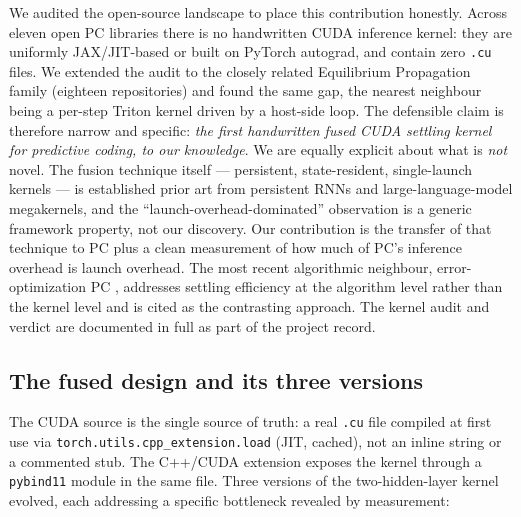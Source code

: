 We audited the open-source landscape to place this contribution honestly. Across eleven open PC
libraries there is no handwritten CUDA inference kernel: they are uniformly JAX/JIT-based or built on
PyTorch autograd, and contain zero \texttt{.cu} files. We extended the audit to the closely related
Equilibrium Propagation family (eighteen repositories) and found the same gap, the nearest neighbour
being a per-step Triton kernel driven by a host-side loop. The defensible claim is therefore narrow and
specific: \emph{the first handwritten fused CUDA settling kernel for predictive coding, to our
knowledge}. We are equally explicit about what is \emph{not} novel. The fusion technique itself ---
persistent, state-resident, single-launch kernels --- is established prior art from persistent RNNs and
large-language-model megakernels, and the ``launch-overhead-dominated'' observation is a generic
framework property, not our discovery. Our contribution is the transfer of that technique to PC plus a
clean measurement of how much of PC's inference overhead is launch overhead. The most recent
algorithmic neighbour, error-optimization PC \citep{goemaere2025epc}, addresses settling efficiency at
the algorithm level rather than the kernel level and is cited as the contrasting approach. The kernel
audit and verdict are documented in full as part of the project record.

\subsection{The fused design and its three versions}

The CUDA source is the single source of truth: a real \texttt{.cu} file compiled at first use via
\texttt{torch.utils.cpp\_extension.load} (JIT, cached), not an inline string or a commented stub. The
C++/CUDA extension exposes the kernel through a \texttt{pybind11} module in the same file. Three versions
of the two-hidden-layer kernel evolved, each addressing a specific bottleneck revealed by measurement:

